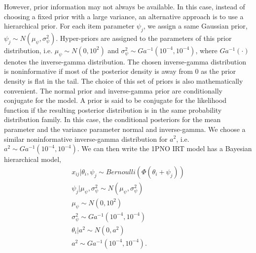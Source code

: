\documentclass[floatsintext, man]{apa7}
\begin{document}
However, prior information may not always be available. In this case, instead of
choosing a fixed prior with a large variance, an alternative approach is to use
a hierarchical prior. For each item parameter $\psi_j$, we assign a same
Gaussian prior, $\psi_j \sim N(\mu_\psi, \sigma_\psi^2)$. Hyper-priors are
assigned to the parameters of this prior distribution, i.e. $\mu_\psi \sim N(0,
10^2)$ and $\sigma_\psi^2 \sim Ga^{-1}(10^{-4}, 10^{-4})$, where $Ga^{-1}
(\cdot)$ denotes the inverse-gamma distribution. The chosen inverse-gamma
distribution is noninformative if most of the posterior density is away from $0$
as the prior density is flat in the tail. The choice of this set of priors is
also mathematically convenient. The normal prior and inverse-gamma prior are
conditionally conjugate for the model. A prior is said to be conjugate for the
likelihood function if the resulting posterior distribution is in the same
probability distribution family. In this case, the conditional posteriors for
the mean parameter and the variance parameter normal and inverse-gamma. We
choose a similar noninformative inverse-gamma distribution for
$a^2$, i.e. $a^2 \sim Ga^{-1} (10^{-4}, 10^{-4})$. We can then write the 1PNO
IRT model has a Bayesian hierarchical model,
\begin{equation}
\label{eq:1pno_original}
\begin{gathered}
  x_{ij} | \theta_i, \psi_j \sim Bernoulli(\Phi(\theta_i + \psi_j))\\
  \psi_j | \mu_\psi, \sigma_\psi^2 \sim N(\mu_\psi, \sigma_\psi^2)\\
  \mu_\psi \sim N(0, 10^2)\\
  \sigma_\psi^2 \sim Ga^{-1}(10^{-4}, 10^{-4})\\
  \theta_i | a^2 \sim N(0, a^2)\\
  a^2 \sim Ga^{-1}(10^{-4}, 10^{-4}).
\end{gathered}
\end{equation}
\end{document}
